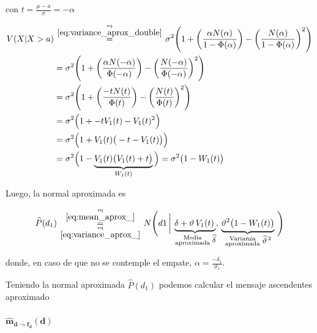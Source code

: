 \documentclass[article]{jss}
\newcommand\hfrac[2]{\genfrac{}{}{0pt}{}{#1}{#2}} %
\begin{document}
\begin{appendix}
con $t = \frac{\mu -a}{\sigma} = -\alpha  $

\begin{equation}\label{eq:variance_aprox_}
\begin{split}
 V(X|  X > a) & \overset{\hfrac{\text{eq}}{\ref{eq:variance_aprox_double}}}{=} \sigma^2 \Bigg( 1 + \bigg(\frac{\alpha N(\alpha)}{1 - \Phi(\alpha) }\bigg) - \bigg(\frac{N(\alpha)}{1 - \Phi(\alpha) }\bigg)^2 \Bigg) \\
 & = \sigma^2 \Bigg( 1 + \bigg(\frac{\alpha N(-\alpha)}{\Phi(-\alpha) }\bigg) - \bigg(\frac{N(-\alpha)}{\Phi(-\alpha) }\bigg)^2 \Bigg) \\
 & = \sigma^2 \Bigg( 1 + \bigg(\frac{-t N(t)}{\Phi(t) }\bigg) - \bigg(\frac{N(t)}{\Phi(t) }\bigg)^2 \Bigg) \\
 & = \sigma^2 \Big( 1 +  -t V_1(t) - V_1(t)^2 \Big) \\
 & = \sigma^2 \Big( 1 + V_1(t) \big(-t  - V_1(t)\big) \Big)  \\
 & = \sigma^2 \Big( 1 - \underbrace{V_1(t) \big(V_1(t) + t \big)}_{W_1(t)} \Big)  = \sigma^2 \big( 1 - W_1(t) \big) 
 \end{split}
\end{equation}

Luego, la normal aproximada es 

\begin{equation}\label{eq:p*_d}
 \widehat{P}(d_1) \overset{\hfrac{\text{eq}}{\ref{eq:mean_aprox_}}}{\underset{\hfrac{\text{eq}}{\ref{eq:variance_aprox_}}}{=}} N\Bigg(d1 \,  \bigg| \, \underbrace{ \delta + \vartheta \, V_1(t) \,}_{\hfrac{\text{\scriptsize Media}}{\text{\scriptsize aproximada}} \, \text{\small $\widehat{\delta}$}} , \,  \underbrace{ \vartheta^2 \big( 1 - W_1(t) \big) }_{\hfrac{\text{\scriptsize Varianza}}{\text{\scriptsize aproximada}} \,\text{\small $\widehat{\vartheta}^{\,2}$}} \, \Bigg)
\end{equation}

donde, en caso de que no se contemple el empate, $\alpha=\frac{-\delta_1}{\vartheta_1}$.

Teniendo la normal aproximada $\widehat{P}(d_1)$ podemos calcular el mensaje ascendentes aproximado 

\paragraph{$\bm{\widehat{m}_{d \rightarrow f_{d}}(d)}$}


\end{appendix}
\end{document}
